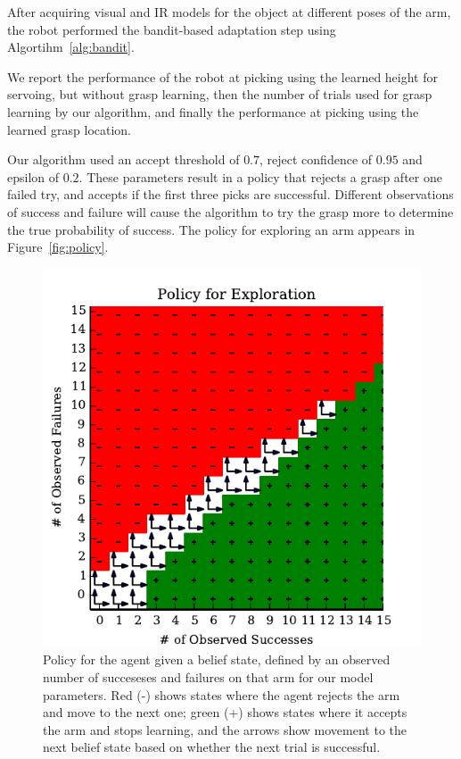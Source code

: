 \documentclass{article}
\begin{document}
After acquiring visual and IR models for the object at different poses
of the arm, the robot performed the bandit-based adaptation step using
Algortihm~\ref{alg:bandit}.

We report the performance of the robot at picking using the learned
height for servoing, but without grasp learning, then the number of
trials used for grasp learning by our algorithm, and finally the
performance at picking using the learned grasp location.

Our algorithm used an accept threshold of $0.7$, reject confidence of
$0.95$ and epsilon of $0.2$.  These parameters result in a policy that
rejects a grasp after one failed try, and accepts if the first three
picks are successful.  Different observations of success and failure
will cause the algorithm to try the grasp more to determine the true
probability of success.  The policy for exploring an arm appears in
Figure~\ref{fig:policy}.

\begin{figure}
\includegraphics{figures/policy.pdf}
\caption{Policy for the agent given a belief state, defined by an
  observed number of succeseses and failures on that arm for our model
  parameters.  Red (-) shows states where the agent rejects the arm
  and move to the next one; green (+) shows states where it accepts
  the arm and stops learning, and the arrows show movement to the next
  belief state based on whether the next trial is successful.}
\end{figure}
\end{document}
